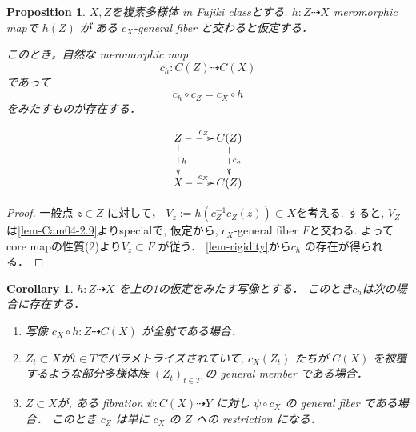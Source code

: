 \documentclass[dvipdfmx,a4paper,11pt]{article} %
\newtheorem{cor}[thm]{Corollary}
\newtheorem{prop}[thm]{Proposition}
\theoremstyle{definition}
\theoremstyle{remark}
\numberwithin{equation}{section}
\begin{document}
\begin{prop}\cite[Proposition 3.10]{Cam04}
\label{prop-Cam04-3.10}
$X, Z$を複素多様体 in Fujiki classとする. 
$h : Z \dashrightarrow X$ meromorphic mapで $h(Z)$ が ある $c_X$-general fiber と交わると仮定する．

このとき，自然な meromorphic map
\[
c_h : C(Z) \dashrightarrow C(X)
\]
であって
\[
c_h \circ c_Z = c_X \circ h
\]
をみたすものが存在する．

\[
\xymatrix{
Z\ar@{-->}[d]^{h} \ar@{-->}[r]^{c_Z}& C(Z)  \ar@{-->}[d]^{c_h} \\
X \ar@{-->}[r]^{c_X}& C(Z)  
}
\]
\end{prop}

\begin{proof}
一般点 $z \in Z$ に対して，
$V_z :=h( c_{Z}^{-1}c_Z(z)) \subset X$を考える. 
すると, $V_Z$は\ref{lem-Cam04-2.9}よりspecialで, 仮定から, $c_X$-general fiber $F$と交わる. 
よってcore mapの性質(2)より$V_z \subset F$ が従う．
\ref{lem-rigidity}から$c_h$ の存在が得られる．
\end{proof}

\begin{cor}\cite[Corollary 3.11]{Cam04}
\label{cor-Cam04-3.11}
$h : Z \dashrightarrow X$ を上の\ref{prop-Cam04-3.10}の仮定をみたす写像とする．
このとき$c_h$は次の場合に存在する．
\begin{enumerate}
\item 写像 $c_X \circ h : Z \dashrightarrow C(X)$ が全射である場合．
\item $Z_t \subset X$が$t \in T$でパラメトライズされていて, $c_X(Z_t)$ たちが $C(X)$ を被覆するような部分多様体族 $(Z_t)_{t \in T}$ の general member である場合．
\item $Z \subset X$が, ある fibration $\psi : C(X) \dashrightarrow Y$ に対し $\psi \circ c_X$ の general fiber である場合． このとき $c_Z$ は単に $c_X$ の $Z$ への restriction になる．
\end{enumerate}
\end{cor}




\end{document}
